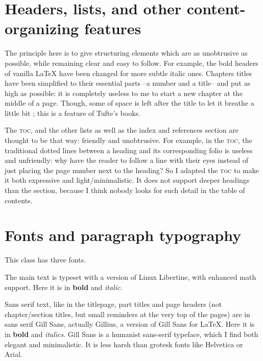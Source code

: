 \documentclass[
    11pt,
]{tufte-style-thesis}
\begin{document}
\section{Headers, lists, and other content-organizing features}

The principle here is to give structuring elements which are as unobtrusive as possible, while remaining clear and easy to follow. For example, the bold headers of vanilla \LaTeX{} have been changed for more subtle italic ones. Chapters titles have been simplified to their essential parts --a number and a title-- and put as high as possible: it is completely useless to me to start a new chapter at the middle of a page. Though, some of space is left after the title to let it breathe a little bit ; this is a feature of Tufte's books.

The \textsc{toc}, and the other lists as well as the index and references section are thought to be that way: friendly and unobtrusive. For example, in the \textsc{toc}, the traditional dotted lines between a heading and its corresponding folio is useless and unfriendly: why have the reader to follow a line with their eyes instead of just placing the page number next to the heading? So I adapted the \textsc{toc} to make it both expressive and light/minimalistic. It does not support deeper headings than the section, because I think nobody looks for such detail in the table of contents.


\section{Fonts and paragraph typography}

This class has three fonts.

The main text is typeset with a version of Linux Libertine, with enhanced math support. Here it is in \textbf{bold} and \textit{italic}.

Sans serif text, like in the titlepage, part titles and page headers (not chapter/section titles, but small reminders at the very top of the pages) are in sans serif {\sffamily Gill Sans}, actually Gillius, a version of Gill Sans for \LaTeX{}. Here it is in {\sffamily\bfseries bold} and {\sffamily\itshape italics}. Gill Sans is a humanist sans-serif typeface, which I find both elegant and minimalistic. It is less harsh than grotesk fonts like Helvetica or Arial.
\end{document}
